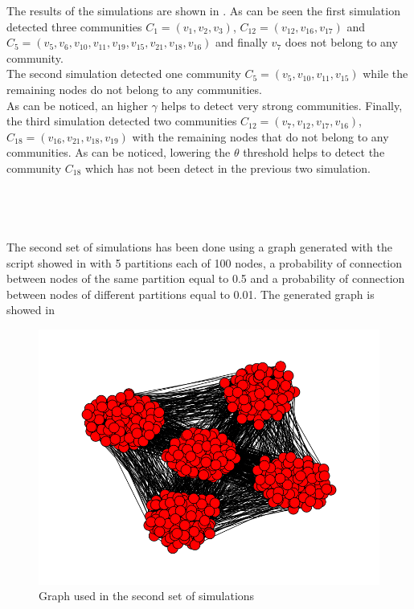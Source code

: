 \documentclass[12pt]{article}
\begin{document}
The results of the simulations are shown in . As can be seen the first simulation detected three communities $C_1 = ({v_1, v_2, v_3})$, $C_{12} =({v_{12}, v_{16}, v_{17}})$ and $C_5 ={(v_5, v_6, v_{10}, v_{11}, v_{19}, v_{15}, v_{21}, v_{18}, v_{16})}$ and finally $v_7$ does not belong to any community. \\
The second simulation detected one community $C_5 = ({v_5, v_{10}, v_{11}, v_{15}})$ while the remaining nodes do not belong to any communities.\\
As can be noticed, an higher $\gamma$ helps to detect very strong communities.
Finally, the third simulation detected two communities $C_{12}=({v_7, v_{12}, v_{17}, v_{16}})$, $C_{18} =({v_{16}, v_{21}, v_{18}, v_{19}})$ with the remaining nodes that do not belong to any communities. As can be noticed, lowering the $\theta$ threshold helps to detect the community $C_{18}$ which has not been detect in the previous two simulation.
\\
\\
\\
\\
\\
The second set of simulations has been done using a graph generated with the script showed in  with 5 partitions each of 100 nodes, a probability of connection between nodes of the same partition equal to 0.5 and a probability of connection between nodes of different partitions equal to 0.01. The generated graph is showed in 
     \begin{figure}[H]
       \centering
         \includegraphics[width=1\textwidth]{Graph500.png}
       \caption{Graph used in the second set of simulations}
       \label{fig:Graph500}
     \end{figure}
\end{document}
